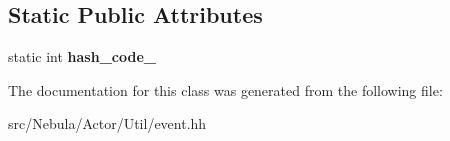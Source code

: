 \subsection*{Static Public Attributes}
\begin{DoxyCompactItemize}
\item 
\hypertarget{classNeb_1_1Event_1_1Actor_1_1Base_ab6711b6cd077caa473f0c3b7416a265f}{static int {\bfseries hash\-\_\-code\-\_\-}}\label{classNeb_1_1Event_1_1Actor_1_1Base_ab6711b6cd077caa473f0c3b7416a265f}

\end{DoxyCompactItemize}


The documentation for this class was generated from the following file\-:\begin{DoxyCompactItemize}
\item 
src/\-Nebula/\-Actor/\-Util/event.\-hh\end{DoxyCompactItemize}
